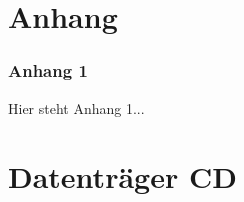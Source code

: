 \appendix

\part{Anhang}

\section{Anhang 1}
\label{anhang:xyz}
Hier steht Anhang 1...
\newpage

\part{Datenträger CD}
